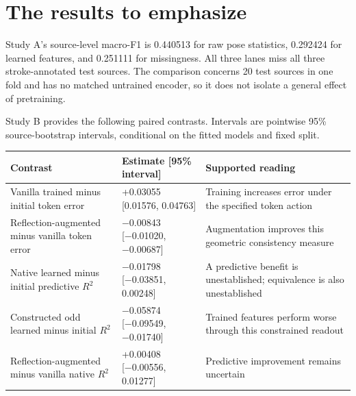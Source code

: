 \documentclass[11pt,letterpaper]{article}
\newcounter{none}
\begin{document}
\section{The results to emphasize}\label{the-results-to-emphasize}

Study A's source-level macro-F1 is 0.440513 for raw pose statistics,
0.292424 for learned features, and 0.251111 for missingness. All three
lanes miss all three stroke-annotated test sources. The comparison
concerns 20 test sources in one fold and has no matched untrained
encoder, so it does not isolate a general effect of pretraining.

Study B provides the following paired contrasts. Intervals are pointwise
95\% source-bootstrap intervals, conditional on the fitted models and
fixed split.

{\def\LTcaptype{none} %
\begin{longtable}[]{@{}
  >{\raggedright\arraybackslash}p{}
  >{\raggedright\arraybackslash}p{}
  >{\raggedright\arraybackslash}p{}@{}}
\toprule\noalign{}
\begin{minipage}[b]{\linewidth}\raggedright
Contrast
\end{minipage} & \begin{minipage}[b]{\linewidth}\raggedright
Estimate {[}95\% interval{]}
\end{minipage} & \begin{minipage}[b]{\linewidth}\raggedright
Supported reading
\end{minipage} \\
\midrule\noalign{}
\endhead
\bottomrule\noalign{}
\endlastfoot
Vanilla trained minus initial token error & +0.03055 {[}0.01576,
0.04763{]} & Training increases error under the specified token
action \\
Reflection-augmented minus vanilla token error & −0.00843 {[}−0.01020,
−0.00687{]} & Augmentation improves this geometric consistency
measure \\
Native learned minus initial predictive \(R^2\) & −0.01798 {[}−0.03851,
0.00248{]} & A predictive benefit is unestablished; equivalence is also
unestablished \\
Constructed odd learned minus initial \(R^2\) & −0.05874 {[}−0.09549,
−0.01740{]} & Trained features perform worse through this constrained
readout \\
Reflection-augmented minus vanilla native \(R^2\) & +0.00408
{[}−0.00556, 0.01277{]} & Predictive improvement remains uncertain \\
\end{longtable}
}
\end{document}
